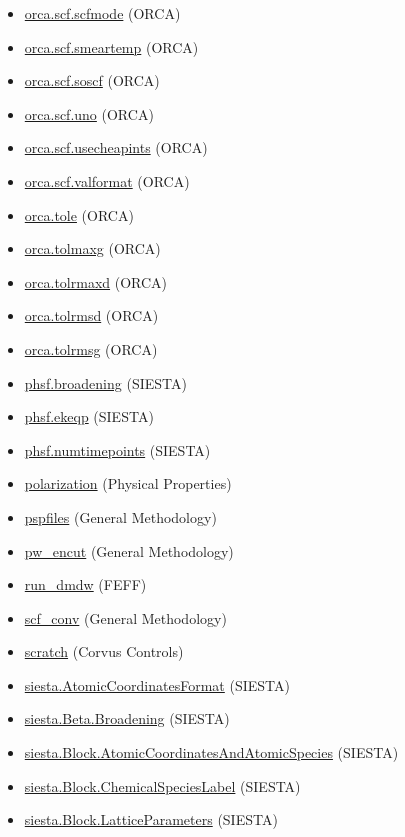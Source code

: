 \documentclass[11pt]{article}
\begin{document}
\begin{itemize}
\item \hyperref[kw:orca-scf-scfmode]{orca.scf.scfmode} (ORCA)
\item \hyperref[kw:orca-scf-smeartemp]{orca.scf.smeartemp} (ORCA)
\item \hyperref[kw:orca-scf-soscf]{orca.scf.soscf} (ORCA)
\item \hyperref[kw:orca-scf-uno]{orca.scf.uno} (ORCA)
\item \hyperref[kw:orca-scf-usecheapints]{orca.scf.usecheapints} (ORCA)
\item \hyperref[kw:orca-scf-valformat]{orca.scf.valformat} (ORCA)
\item \hyperref[kw:orca-tole]{orca.tole} (ORCA)
\item \hyperref[kw:orca-tolmaxg]{orca.tolmaxg} (ORCA)
\item \hyperref[kw:orca-tolrmaxd]{orca.tolrmaxd} (ORCA)
\item \hyperref[kw:orca-tolrmsd]{orca.tolrmsd} (ORCA)
\item \hyperref[kw:orca-tolrmsg]{orca.tolrmsg} (ORCA)
\item \hyperref[kw:phsf-broadening]{phsf.broadening} (SIESTA)
\item \hyperref[kw:phsf-ekeqp]{phsf.ekeqp} (SIESTA)
\item \hyperref[kw:phsf-numtimepoints]{phsf.numtimepoints} (SIESTA)
\item \hyperref[kw:polarization]{polarization} (Physical Properties)
\item \hyperref[kw:pspfiles]{pspfiles} (General Methodology)
\item \hyperref[kw:pw-encut]{pw\_encut} (General Methodology)
\item \hyperref[kw:run-dmdw]{run\_dmdw} (FEFF)
\item \hyperref[kw:scf-conv]{scf\_conv} (General Methodology)
\item \hyperref[kw:scratch]{scratch} (Corvus Controls)
\item \hyperref[kw:siesta-AtomicCoordinatesFormat]{siesta.AtomicCoordinatesFormat} (SIESTA)
\item \hyperref[kw:siesta-Beta-Broadening]{siesta.Beta.Broadening} (SIESTA)
\item \hyperref[kw:siesta-Block-AtomicCoordinatesAndAtomicSpecies]{siesta.Block.AtomicCoordinatesAndAtomicSpecies} (SIESTA)
\item \hyperref[kw:siesta-Block-ChemicalSpeciesLabel]{siesta.Block.ChemicalSpeciesLabel} (SIESTA)
\item \hyperref[kw:siesta-Block-LatticeParameters]{siesta.Block.LatticeParameters} (SIESTA)

\end{itemize}
\end{document}
